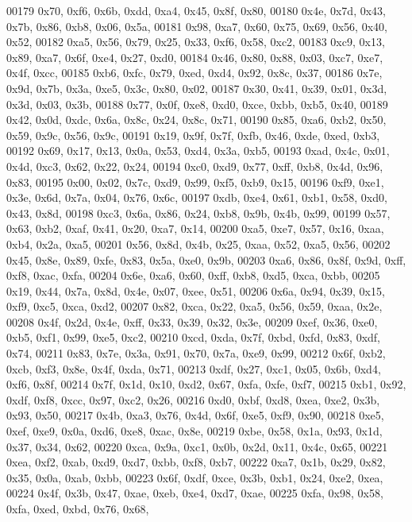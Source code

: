 \begin{DoxyCode}
00179   0x70, 0xf6, 0x6b, 0xdd, 0xa4, 0x45, 0x8f, 0x80,
00180   0x4e, 0x7d, 0x43, 0x7b, 0x86, 0xb8, 0x06, 0x5a,
00181   0x98, 0xa7, 0x60, 0x75, 0x69, 0x56, 0x40, 0x52,
00182   0xa5, 0x56, 0x79, 0x25, 0x33, 0xf6, 0x58, 0xc2,
00183   0xc9, 0x13, 0x89, 0xa7, 0x6f, 0xe4, 0x27, 0xd0,
00184   0x46, 0x80, 0x88, 0x03, 0xc7, 0xe7, 0x4f, 0xcc,
00185   0xb6, 0xfc, 0x79, 0xed, 0xd4, 0x92, 0x8c, 0x37,
00186   0x7e, 0x9d, 0x7b, 0x3a, 0xe5, 0x3c, 0x80, 0x02,
00187   0x30, 0x41, 0x39, 0x01, 0x3d, 0x3d, 0x03, 0x3b,
00188   0x77, 0x0f, 0xe8, 0xd0, 0xce, 0xbb, 0xb5, 0x40,
00189   0x42, 0x0d, 0xdc, 0x6a, 0x8c, 0x24, 0x8c, 0x71,
00190   0x85, 0xa6, 0xb2, 0x50, 0x59, 0x9c, 0x56, 0x9c,
00191   0x19, 0x9f, 0x7f, 0xfb, 0x46, 0xde, 0xed, 0xb3,
00192   0x69, 0x17, 0x13, 0x0a, 0x53, 0xd4, 0x3a, 0xb5,
00193   0xad, 0x4c, 0x01, 0x4d, 0xc3, 0x62, 0x22, 0x24,
00194   0xc0, 0xd9, 0x77, 0xff, 0xb8, 0x4d, 0x96, 0x83,
00195   0x00, 0x02, 0x7c, 0xd9, 0x99, 0xf5, 0xb9, 0x15,
00196   0xf9, 0xe1, 0x3e, 0x6d, 0x7a, 0x04, 0x76, 0x6c,
00197   0xdb, 0xe4, 0x61, 0xb1, 0x58, 0xd0, 0x43, 0x8d,
00198   0xc3, 0x6a, 0x86, 0x24, 0xb8, 0x9b, 0x4b, 0x99,
00199   0x57, 0x63, 0xb2, 0xaf, 0x41, 0x20, 0xa7, 0x14,
00200   0xa5, 0xe7, 0x57, 0x16, 0xaa, 0xb4, 0x2a, 0xa5,
00201   0x56, 0x8d, 0x4b, 0x25, 0xaa, 0x52, 0xa5, 0x56,
00202   0x45, 0x8e, 0x89, 0xfe, 0x83, 0x5a, 0xe0, 0x9b,
00203   0xa6, 0x86, 0x8f, 0x9d, 0xff, 0xf8, 0xac, 0xfa,
00204   0x6e, 0xa6, 0x60, 0xff, 0xb8, 0xd5, 0xca, 0xbb,
00205   0x19, 0x44, 0x7a, 0x8d, 0x4e, 0x07, 0xee, 0x51,
00206   0x6a, 0x94, 0x39, 0x15, 0xf9, 0xc5, 0xca, 0xd2,
00207   0x82, 0xca, 0x22, 0xa5, 0x56, 0x59, 0xaa, 0x2e,
00208   0x4f, 0x2d, 0x4e, 0xff, 0x33, 0x39, 0x32, 0x3e,
00209   0xef, 0x36, 0xe0, 0xb5, 0xf1, 0x99, 0xe5, 0xc2,
00210   0xcd, 0xda, 0x7f, 0xbd, 0xfd, 0x83, 0xdf, 0x74,
00211   0x83, 0x7e, 0x3a, 0x91, 0x70, 0x7a, 0xe9, 0x99,
00212   0x6f, 0xb2, 0xcb, 0xf3, 0x8e, 0x4f, 0xda, 0x71,
00213   0xdf, 0x27, 0xc1, 0x05, 0x6b, 0xd4, 0xf6, 0x8f,
00214   0x7f, 0x1d, 0x10, 0xd2, 0x67, 0xfa, 0xfe, 0xf7,
00215   0xb1, 0x92, 0xdf, 0xf8, 0xcc, 0x97, 0xc2, 0x26,
00216   0xd0, 0xbf, 0xd8, 0xea, 0xe2, 0x3b, 0x93, 0x50,
00217   0x4b, 0xa3, 0x76, 0x4d, 0x6f, 0xe5, 0xf9, 0x90,
00218   0xe5, 0xef, 0xe9, 0x0a, 0xd6, 0xe8, 0xac, 0x8e,
00219   0xbe, 0x58, 0x1a, 0x93, 0x1d, 0x37, 0x34, 0x62,
00220   0xca, 0x9a, 0xc1, 0x0b, 0x2d, 0x11, 0x4c, 0x65,
00221   0xea, 0xf2, 0xab, 0xd9, 0xd7, 0xbb, 0xf8, 0xb7,
00222   0xa7, 0x1b, 0x29, 0x82, 0x35, 0x0a, 0xab, 0xbb,
00223   0x6f, 0xdf, 0xce, 0x3b, 0xb1, 0x24, 0xe2, 0xea,
00224   0x4f, 0x3b, 0x47, 0xae, 0xeb, 0xe4, 0xd7, 0xae,
00225   0xfa, 0x98, 0x58, 0xfa, 0xed, 0xbd, 0x76, 0x68,

\end{DoxyCode}
